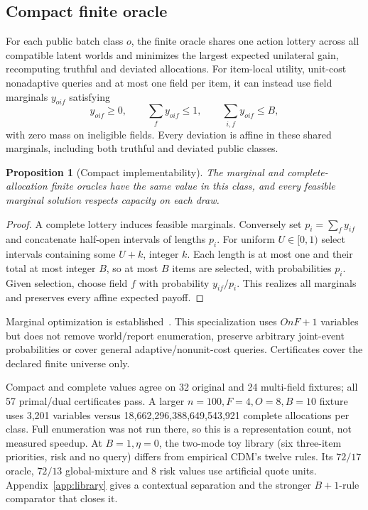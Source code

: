 \documentclass[11pt]{article}
\newtheorem{proposition}{Proposition}
\begin{document}
\subsection{Compact finite oracle}
For each public batch class $o$, the finite oracle shares one action lottery
across all compatible latent worlds and minimizes the largest expected
unilateral gain, recomputing truthful and deviated allocations. For item-local
utility, unit-cost nonadaptive queries and at most one field per item, it can
instead use field marginals $y_{oif}$ satisfying
\[
 y_{oif}\ge0,\qquad \sum_f y_{oif}\le1,\qquad
 \sum_{i,f}y_{oif}\le B,
\]
with zero mass on ineligible fields. Every deviation is affine in these shared
marginals, including both truthful and deviated public classes.

\begin{proposition}[Compact implementability]\label{prop:compact}
The marginal and complete-allocation finite oracles have the same value in
this class, and every feasible marginal solution respects capacity on each draw.
\end{proposition}
\begin{proof}
A complete lottery induces feasible marginals. Conversely set
$p_i=\sum_f y_{if}$ and concatenate half-open intervals of lengths $p_i$.
For uniform $U\in[0,1)$ select intervals containing some $U+k$, integer $k$.
Each length is at most one and their total at most integer $B$, so at most
$B$ items are selected, with probabilities $p_i$. Given selection, choose
field $f$ with probability $y_{if}/p_i$. This realizes all marginals and
preserves every affine expected payoff.
\end{proof}
Marginal optimization is established~\cite{marginals}. This specialization
uses $OnF+1$ variables but does not remove world/report enumeration, preserve
arbitrary joint-event probabilities or cover general adaptive/nonunit-cost
queries. Certificates cover the declared finite universe only.

Compact and complete values agree on 32 original and 24 multi-field fixtures;
all 57 primal/dual certificates pass. A larger $n=100,F=4,O=8,B=10$ fixture
uses 3,201 variables versus 18,662,296,388,649,543,921 complete allocations per
class. Full enumeration was not run there, so this is a representation count,
not measured speedup. At $B=1,\eta=0$, the two-mode toy library (six three-item priorities,
risk and no query) differs from empirical CDM's twelve rules. Its $72/17$
oracle, $72/13$ global-mixture and 8 risk values use artificial quote units.
Appendix~\ref{app:library} gives a contextual separation and the stronger
$B+1$-rule comparator that closes it.
\end{document}
